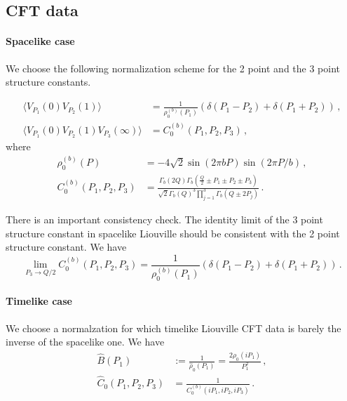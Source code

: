 \documentclass[11pt]{article}
\begin{document}
\subsection{CFT data}
\paragraph{Spacelike case} We choose the following normalization scheme for the 2 point and the 3 point structure constants.

\begin{equation}
    \begin{aligned}
        \langle V_{P_1}(0) V_{P_2}(1)\rangle&=\frac{1}{\rho^{(b)}_0(P_1)}\left(\delta(P_1-P_2)+\delta(P_1+P_2)\right)\,,\\
        \langle V_{P_1}(0) V_{P_2}(1) V_{P_3}(\infty)\rangle&=C_0^{(b)}(P_1,P_2,P_3)\,,
    \end{aligned}
\end{equation}
where 
\begin{equation}
    \begin{aligned}
        \rho^{(b)}_0(P)&=-4\sqrt{2}\sin(2\pi b P)\sin(2\pi P/b)\,,\\
        C_0^{(b)}(P_1,P_2,P_3)&= \frac{\Gamma_b(2Q)\Gamma_b(\frac{Q}{2}\pm P_1 \pm P_2 \pm P_3)}{\sqrt{2} \Gamma_b(Q)^3 \prod_{j=1}^{3} \Gamma_b(Q\pm 2P_j)}\,.
    \end{aligned}
\end{equation}

There is an important consistency check. The identity limit of the 3 point structure constant in spacelike Liouville should be consistent with the 2 point structure constant. We have
\begin{equation}
    \underset{P_3 \to Q/2}{\lim} C_0^{(b)}(P_1,P_2,P_3) = \frac{1}{\rho_0^{(b)}(P_1)}\left(\delta(P_1-P_2)+\delta(P_1+P_2)\right)\,.
\end{equation}

\paragraph{Timelike case}
We choose a normalzation for which timelike Liouville CFT data is barely the inverse of the spacelike one. We have
\begin{equation}
    \begin{aligned}
        \hat{B}(P_1) &:= \frac{1}{\hat{\rho}_0(P_1)} = \frac{2 \rho_0(iP_1)}{P^2_1}\,,\\
        \hat{C}_0(P_1,P_2,P_3) &= \frac{1}{C_0^{(b)}(iP_1,iP_2,iP_3)}\,.
    \end{aligned}
\end{equation}
\end{document}
